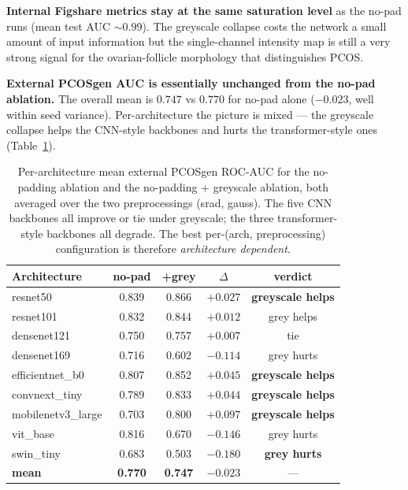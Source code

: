 \documentclass[11pt]{article}
\begin{document}
\textbf{Internal Figshare metrics stay at the same saturation level}
as the no-pad runs (mean test AUC $\sim 0.99$). The greyscale collapse
costs the network a small amount of input information but the
single-channel intensity map is still a very strong signal for the
ovarian-follicle morphology that distinguishes PCOS.

\textbf{External PCOSgen AUC is essentially unchanged from the no-pad
ablation.} The overall mean is $0.747$ vs $0.770$ for no-pad alone
($-0.023$, well within seed variance). Per-architecture the picture is
mixed — the greyscale collapse helps the CNN-style backbones and hurts
the transformer-style ones (Table~\ref{tab:nopad-gray-per-arch}).
\begin{table}[h]
  \centering
  \small
  \begin{tabular}{l|ccc|c}
    \hline
    \textbf{Architecture} & \textbf{no-pad} & \textbf{+grey} & \textbf{$\Delta$} & \textbf{verdict} \\
    \hline
    resnet50            & 0.839 & 0.866 & $+0.027$ & \textbf{greyscale helps} \\
    resnet101           & 0.832 & 0.844 & $+0.012$ & grey helps \\
    densenet121         & 0.750 & 0.757 & $+0.007$ & tie \\
    densenet169         & 0.716 & 0.602 & $-0.114$ & grey hurts \\
    efficientnet\_b0    & 0.807 & 0.852 & $+0.045$ & \textbf{greyscale helps} \\
    convnext\_tiny      & 0.789 & 0.833 & $+0.044$ & \textbf{greyscale helps} \\
    mobilenetv3\_large  & 0.703 & 0.800 & $+0.097$ & \textbf{greyscale helps} \\
    vit\_base           & 0.816 & 0.670 & $-0.146$ & grey hurts \\
    swin\_tiny          & 0.683 & 0.503 & $-0.180$ & \textbf{grey hurts} \\
    \hline
    \textbf{mean}       & \textbf{0.770} & \textbf{0.747} & $\mathbf{-0.023}$ & --- \\
    \hline
  \end{tabular}
  \caption{Per-architecture mean external PCOSgen ROC-AUC for the
    no-padding ablation and the no-padding + greyscale ablation, both
    averaged over the two preprocessings (srad, gauss). The five CNN
    backbones all improve or tie under greyscale; the three
    transformer-style backbones all degrade. The best per-(arch,
    preprocessing) configuration is therefore \emph{architecture
    dependent}.}
  \label{tab:nopad-gray-per-arch}
\end{table}
\end{document}

